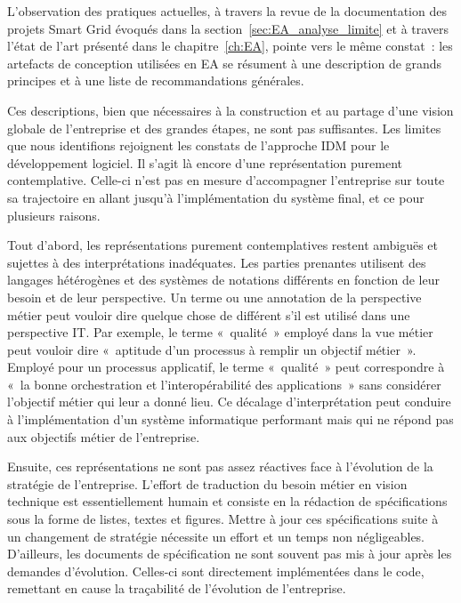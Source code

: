 
L'observation des pratiques actuelles, à travers la revue de la
documentation des projets Smart Grid évoqués dans la
section~\ref{sec:EA_analyse_limite} et à travers l'état de l'art présenté
dans le chapitre~\ref{ch:EA}, pointe vers le même constat~:
les artefacts de conception utilisées en EA se résument à une description de
grands principes et à une liste de recommandations générales.

Ces descriptions, bien que nécessaires à la construction et au
partage d'une vision globale de l'entreprise et des grandes étapes, ne sont pas
suffisantes. Les limites que nous identifions rejoignent les constats de
l'approche IDM pour le développement logiciel. Il s'agit là encore d'une
représentation purement contemplative. Celle-ci n'est pas en mesure
d'accompagner l'entreprise sur toute sa trajectoire en allant jusqu'à
l'implémentation du système final, et ce pour plusieurs raisons.

Tout d'abord, les représentations purement contemplatives restent ambiguës et
sujettes à des interprétations inadéquates. Les parties prenantes utilisent des
langages hétérogènes et des systèmes de notations différents en fonction de
leur besoin et de leur perspective. Un terme ou une annotation de la
perspective métier peut vouloir dire quelque chose de différent s'il est
utilisé dans une perspective IT. Par exemple, le terme «~qualité~» employé dans
la vue métier peut vouloir dire «~aptitude d'un processus à remplir un objectif
métier~». Employé pour un processus applicatif, le terme «~qualité~» peut
correspondre à «~la bonne orchestration et l'interopérabilité des
applications~» sans considérer l'objectif métier qui leur a donné lieu. Ce
décalage d'interprétation peut conduire à l'implémentation d'un système
informatique performant mais qui ne répond pas aux objectifs métier de
l'entreprise.

Ensuite, ces représentations ne sont pas assez réactives face à l'évolution de
la stratégie de l'entreprise. L'effort de traduction du besoin métier en vision
technique est essentiellement humain et consiste en la rédaction de
spécifications sous la forme de listes, textes et figures. Mettre à jour ces
spécifications suite à un changement de stratégie nécessite un effort et un
temps non négligeables. D'ailleurs, les documents de spécification ne sont
souvent pas mis à jour après les demandes d'évolution. Celles-ci sont
directement implémentées dans le code, remettant en cause la traçabilité de
l'évolution de l'entreprise.

